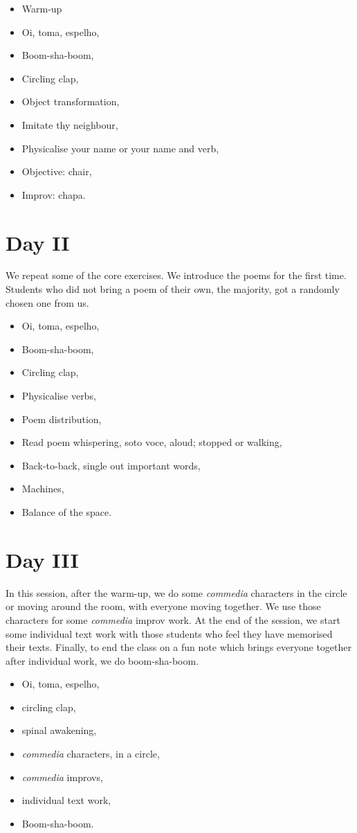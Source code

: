 \documentclass[article,twocolumn,twoside]{memoir}
\begin{document}
\begin{itemize}
\item Warm-up
\item Oi, toma, espelho,
\item Boom-sha-boom,
\item Circling clap,
\item Object transformation,
\item Imitate thy neighbour,
\item Physicalise your name or your name and verb,
\item Objective: chair,
\item Improv: chapa.
\end{itemize}
\section{Day II}

We repeat some of the core exercises. We introduce the poems for the first
time. Students who did not bring a poem of their own, the majority, got a
randomly chosen one from us.

\begin{itemize}
\item Oi, toma, espelho,
\item Boom-sha-boom,
\item Circling clap,
\item Physicalise verbs,
\item Poem distribution,
\item Read poem whispering, soto voce, aloud; stopped or walking,
\item Back-to-back, single out important words,
\item Machines,
\item Balance of the space.
\end{itemize}
\section{Day III}
In this session, after the warm-up, we do some \textit{commedia} characters in
the circle or moving around the room, with everyone moving together. We use
those characters for some \textit{commedia} improv work. At the end of the
session, we start some individual text work with those students who feel they
have memorised their texts. Finally, to end the class on a fun note which
brings everyone together after individual work, we do boom-sha-boom.

\begin{itemize}
\item Oi, toma, espelho,
\item circling clap,
\item spinal awakening,
\item \textit{commedia} characters, in a circle,
\item \textit{commedia} improvs,
\item individual text work,
\item Boom-sha-boom.
\end{itemize}
\end{document}
